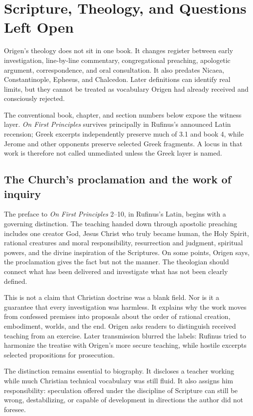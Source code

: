 \section{Scripture, Theology, and Questions Left Open}
\label{sec:origen-theology}

Origen's theology does not sit in one book. It changes register between early
investigation, line-by-line commentary, congregational preaching, apologetic
argument, correspondence, and oral consultation. It also predates Nicaea,
Constantinople, Ephesus, and Chalcedon. Later definitions can identify real
limits, but they cannot be treated as vocabulary Origen had already received
and consciously rejected.

The conventional book, chapter, and section numbers below expose the witness
layer. \emph{On First Principles} survives principally in Rufinus's announced
Latin recension; Greek excerpts independently preserve much of 3.1 and book 4,
while Jerome and other opponents preserve selected Greek fragments. A locus in
that work is therefore not called unmediated unless the Greek layer is named.

\subsection{The Church's proclamation and the work of inquiry}

The preface to \emph{On First Principles} 2--10, in Rufinus's Latin, begins
with a governing distinction.
The teaching handed down through apostolic preaching includes one creator God,
Jesus Christ who truly became human, the Holy Spirit, rational creatures and
moral responsibility, resurrection and judgment, spiritual powers, and the
divine inspiration of the Scriptures. On some points, Origen says, the
proclamation gives the fact but not the manner. The theologian should connect
what has been delivered and investigate what has not been clearly defined.

This is not a claim that Christian doctrine was a blank field. Nor is it a
guarantee that every investigation was harmless. It explains why the work
moves from confessed premises into proposals about the order of rational
creation, embodiment, worlds, and the end. Origen asks readers to distinguish
received teaching from an exercise. Later transmission blurred the labels:
Rufinus tried to harmonize the treatise with Origen's more secure teaching,
while hostile excerpts selected propositions for prosecution.

The distinction remains essential to biography. It discloses a teacher working
while much Christian technical vocabulary was still fluid. It also assigns him
responsibility: speculation offered under the discipline of Scripture can
still be wrong, destabilizing, or capable of development in directions the
author did not foresee.

